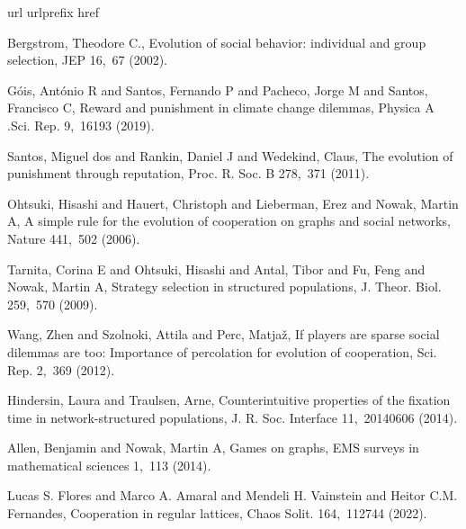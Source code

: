 \documentclass[twocolumn,aps,amsmath,pre,floatfix,superscriptaddress]{revtex4-2}
\begin{document}
\begin{thebibliography}{10}
\expandafter\ifx\csname url\endcsname\relax
  \def\url#1{\texttt{#1}}\fi
\expandafter\ifx\csname urlprefix\endcsname\relax\def\urlprefix{URL }\fi
\expandafter\ifx\csname href\endcsname\relax
  \def\href#1#2{#2} \def\path#1{#1}\fi


Bergstrom, Theodore C., 
{Evolution of social behavior: individual and group selection},
\href {http://dx.doi.org/10.1257/0895330027265}
{JEP 16,~67 (2002)}.

G{\'o}is, Ant{\'o}nio R and Santos, Fernando P and Pacheco, Jorge M and Santos, Francisco C, 
{Reward and punishment in climate change dilemmas},
\href {http://dx.doi.org/10.1038/s41598-019-52524-8}
{Physica A .Sci. Rep. 9,~16193  (2019)}.

Santos, Miguel dos and Rankin, Daniel J and Wedekind, Claus,
{The evolution of punishment through reputation},
\href {http://dx.doi.org/10.1098/rspb.2010.1275}
{Proc. R. Soc. B 278,~371 (2011)}.

Ohtsuki, Hisashi and Hauert, Christoph and Lieberman, Erez and Nowak, Martin A, 
{A simple rule for the evolution of cooperation on graphs and social networks},
\href {http://dx.doi.org/10.1038/nature04605}
{Nature 441,~502 (2006)}.

Tarnita, Corina E and Ohtsuki, Hisashi and Antal, Tibor and Fu, Feng and Nowak, Martin A, 
{Strategy selection in structured populations},
\href {http://dx.doi.org/10.1016/j.jtbi.2009.03.035}
{J. Theor. Biol. 259,~570 (2009)}.

Wang, Zhen and Szolnoki, Attila and Perc, Matja{\v{z}},
{If players are sparse social dilemmas are too: Importance of percolation for evolution of cooperation},
\href {http://dx.doi.org/10.1038/srep00369}
{Sci. Rep. 2,~369 (2012)}.

Hindersin, Laura and Traulsen, Arne,
{Counterintuitive properties of the fixation time in network-structured populations},
\href {http://dx.doi.org/10.1098/rsif.2014.0606}
{J. R. Soc. Interface 11,~20140606 (2014)}.

Allen, Benjamin and Nowak, Martin A,
{Games on graphs},
\href {http://dx.doi.org/10.4171/EMSS/3}
{EMS surveys in mathematical sciences 1,~113 (2014)}.

Lucas S. Flores and Marco A. Amaral and Mendeli H. Vainstein and Heitor C.M. Fernandes,
{Cooperation in regular lattices},
\href {https://doi.org/10.1016/j.chaos.2022.112744}
{Chaos Solit. 164,~112744 (2022)}.


\end{thebibliography}
\end{document}
